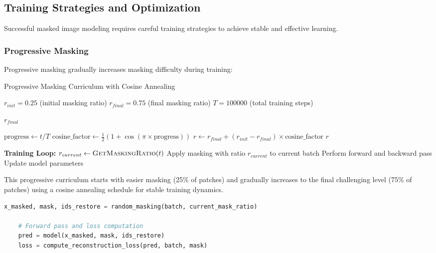 \subsection{Training Strategies and Optimization}

Successful masked image modeling requires careful training strategies to achieve stable and effective learning.

\subsubsection{Progressive Masking}

Progressive masking gradually increases masking difficulty during training:

\begin{algorithm}[h]
\caption{Progressive Masking Curriculum with Cosine Annealing}
\begin{algorithmic}[1]
\Require $r_{init} = 0.25$ (initial masking ratio)
\Require $r_{final} = 0.75$ (final masking ratio)
\Require $T = 100000$ (total training steps)

 
     
        \State \Return $r_{final}$
    \EndIf
    
    \State $\text{progress} \gets t / T$ 
    \State $\text{cosine\_factor} \gets \frac{1}{2}(1 + \cos(\pi \times \text{progress}))$ 
    \State $r \gets r_{final} + (r_{init} - r_{final}) \times \text{cosine\_factor}$
    \State \Return $r$
\EndFunction

\Statex
\textbf{Training Loop:}
    \State $r_{current} \gets \textsc{GetMaskingRatio}(t)$ 
    \State Apply masking with ratio $r_{current}$ to current batch
    \State Perform forward and backward pass
    \State Update model parameters
\EndFor
\end{algorithmic}
\end{algorithm}

This progressive curriculum starts with easier masking (25\% of patches) and gradually increases to the final challenging level (75\% of patches) using a cosine annealing schedule for stable training dynamics.

\begin{lstlisting}[language=Python, caption={Training loop with progressive masking}]
    x_masked, mask, ids_restore = random_masking(batch, current_mask_ratio)
    
    # Forward pass and loss computation
    pred = model(x_masked, mask, ids_restore)
    loss = compute_reconstruction_loss(pred, batch, mask)
\end{lstlisting}

